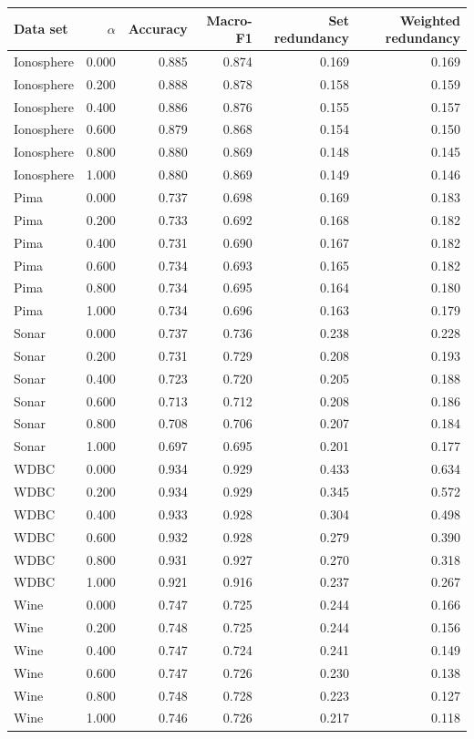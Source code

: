 \begin{tabular}{lrrrrr}
\toprule
Data set & $\alpha$ & Accuracy & Macro-F1 & Set redundancy & Weighted redundancy \\
\midrule
Ionosphere & 0.000 & 0.885 & 0.874 & 0.169 & 0.169 \\
Ionosphere & 0.200 & 0.888 & 0.878 & 0.158 & 0.159 \\
Ionosphere & 0.400 & 0.886 & 0.876 & 0.155 & 0.157 \\
Ionosphere & 0.600 & 0.879 & 0.868 & 0.154 & 0.150 \\
Ionosphere & 0.800 & 0.880 & 0.869 & 0.148 & 0.145 \\
Ionosphere & 1.000 & 0.880 & 0.869 & 0.149 & 0.146 \\
Pima & 0.000 & 0.737 & 0.698 & 0.169 & 0.183 \\
Pima & 0.200 & 0.733 & 0.692 & 0.168 & 0.182 \\
Pima & 0.400 & 0.731 & 0.690 & 0.167 & 0.182 \\
Pima & 0.600 & 0.734 & 0.693 & 0.165 & 0.182 \\
Pima & 0.800 & 0.734 & 0.695 & 0.164 & 0.180 \\
Pima & 1.000 & 0.734 & 0.696 & 0.163 & 0.179 \\
Sonar & 0.000 & 0.737 & 0.736 & 0.238 & 0.228 \\
Sonar & 0.200 & 0.731 & 0.729 & 0.208 & 0.193 \\
Sonar & 0.400 & 0.723 & 0.720 & 0.205 & 0.188 \\
Sonar & 0.600 & 0.713 & 0.712 & 0.208 & 0.186 \\
Sonar & 0.800 & 0.708 & 0.706 & 0.207 & 0.184 \\
Sonar & 1.000 & 0.697 & 0.695 & 0.201 & 0.177 \\
WDBC & 0.000 & 0.934 & 0.929 & 0.433 & 0.634 \\
WDBC & 0.200 & 0.934 & 0.929 & 0.345 & 0.572 \\
WDBC & 0.400 & 0.933 & 0.928 & 0.304 & 0.498 \\
WDBC & 0.600 & 0.932 & 0.928 & 0.279 & 0.390 \\
WDBC & 0.800 & 0.931 & 0.927 & 0.270 & 0.318 \\
WDBC & 1.000 & 0.921 & 0.916 & 0.237 & 0.267 \\
Wine & 0.000 & 0.747 & 0.725 & 0.244 & 0.166 \\
Wine & 0.200 & 0.748 & 0.725 & 0.244 & 0.156 \\
Wine & 0.400 & 0.747 & 0.724 & 0.241 & 0.149 \\
Wine & 0.600 & 0.747 & 0.726 & 0.230 & 0.138 \\
Wine & 0.800 & 0.748 & 0.728 & 0.223 & 0.127 \\
Wine & 1.000 & 0.746 & 0.726 & 0.217 & 0.118 \\
\bottomrule
\end{tabular}
